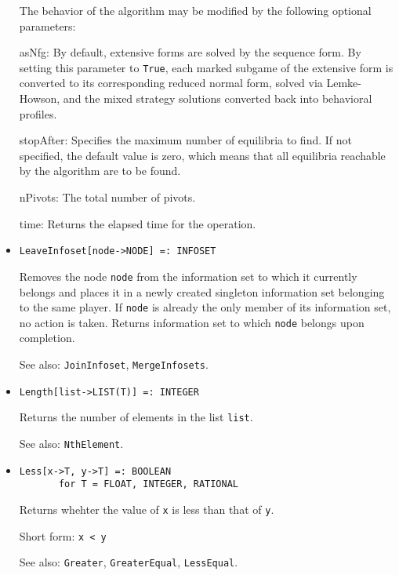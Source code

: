 \begin{itemize}
The behavior of the algorithm may be modified by the following
optional parameters:
\bd
\item
[asNfg:] By default, extensive forms are solved by the sequence form.
By setting this parameter to \verb+True+, each marked subgame of the extensive
form is converted to its corresponding reduced normal form, solved
via Lemke-Howson, and the mixed strategy solutions converted back into
behavioral profiles.
\item
[stopAfter:] Specifies the maximum number of equilibria to find.  If
not specified, the default value is zero, which means that all
equilibria reachable by the algorithm are to be found.
\item
[nPivots:] The total number of pivots. 
\item
[time:] Returns the elapsed time for the operation.
\ed
\ed

\item
\protect \large \begin{verbatim}
LeaveInfoset[node->NODE] =: INFOSET
\end{verbatim}\normalsize

\bd
Removes the node \verb+node+ from the information set to
which it currently belongs and places it in a newly created
singleton information set belonging to the same player.  If \verb+node+
is already the only member of its information set, no action is taken.
Returns information set to which \verb+node+ belongs upon completion.
\item
[See also:] {\tt JoinInfoset}, {\tt MergeInfosets}.
\ed

\item
\protect \large \begin{verbatim}
Length[list->LIST(T)] =: INTEGER
\end{verbatim}\normalsize

\bd
Returns the number of elements in the list \verb+list+.
\item
[See also:] {\tt NthElement}.
\ed

\item
\protect \large \begin{verbatim}
Less[x->T, y->T] =: BOOLEAN
       for T = FLOAT, INTEGER, RATIONAL
\end{verbatim}\normalsize

\bd
Returns whehter the value of \verb+x+ is less than that of
\verb+y+.
\item
[Short form:] \verb+x < y+
\item
[See also:] {\tt Greater}, {\tt GreaterEqual}, {\tt LessEqual}.
\ed


\end{itemize}
